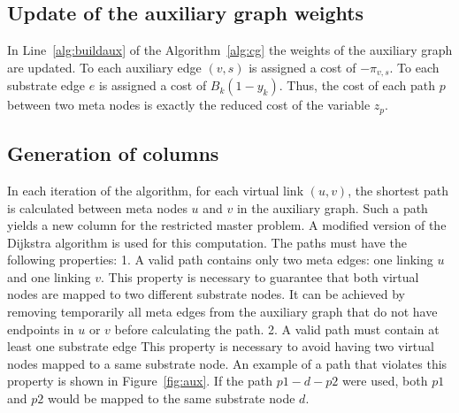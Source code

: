 \documentclass[conference]{IEEEtran}
\begin{document}
\subsection{Update of the auxiliary graph weights}\label{sec:update}
In Line~\ref{alg:buildaux} of the Algorithm~\ref{alg:cg} the weights of the auxiliary graph are updated.
To each auxiliary edge $(v,s)$ is assigned a cost of $-\pi_{v,s}$. 
To each substrate edge $e$ is assigned a cost of $B_{k}(1 - y_{k})$. 
Thus, the cost of each path $p$ between two meta nodes is exactly the reduced cost of the variable $z_{p}$.


\subsection{Generation of columns}
In each iteration of the algorithm, for each virtual link $(u,v)$, the shortest path is calculated between meta nodes $u$ and $v$ in the auxiliary graph.
Such a path yields a new column for the restricted master problem. 
A modified version of the Dijkstra algorithm is used for this computation. 
The paths must have the following properties:
1. A valid path contains only two meta edges: one linking $u$ and one linking $v$.
This property is necessary to guarantee that both virtual nodes are mapped to two different substrate nodes. 
It can be achieved by removing temporarily all meta edges from the auxiliary graph that do not have endpoints in $u$ or $v$ before calculating the path. 
2. A valid path must contain at least one substrate edge
This property is necessary to avoid having two virtual nodes mapped to a same substrate node.
An example of a path that violates this property is shown in Figure~\ref{fig:aux}. 
If the path $p1-d-p2$ were used, both $p1$ and $p2$ would be mapped to the same substrate node $d$. 
\end{document}
